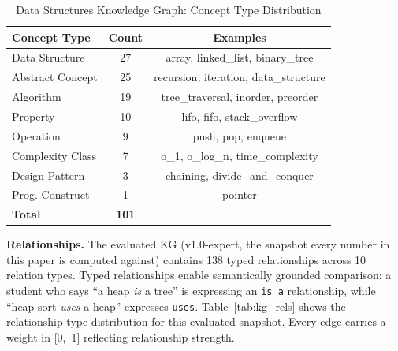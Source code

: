\documentclass[conference]{IEEEtran}
\begin{document}
\begin{table}[t]
\caption{Data Structures Knowledge Graph: Concept Type Distribution}
\label{tab:kg_concepts}
\centering
\begin{tabular}{lcc}
\toprule
\textbf{Concept Type} & \textbf{Count} & \textbf{Examples} \\
\midrule
Data Structure     & 27 & array, linked\_list, binary\_tree \\
Abstract Concept   & 25 & recursion, iteration, data\_structure \\
Algorithm          & 19 & tree\_traversal, inorder, preorder \\
Property           & 10 & lifo, fifo, stack\_overflow \\
Operation          &  9 & push, pop, enqueue \\
Complexity Class   &  7 & o\_1, o\_log\_n, time\_complexity \\
Design Pattern     &  3 & chaining, divide\_and\_conquer \\
Prog. Construct    &  1 & pointer \\
\midrule
\textbf{Total}     & \textbf{101} & \\
\bottomrule
\end{tabular}
\end{table}

\textbf{Relationships.} The evaluated KG (v1.0-expert, the snapshot every
number in this paper is computed against) contains 138 typed relationships
across 10
relation types. Typed relationships enable semantically grounded comparison: a
student who says ``a heap \emph{is} a tree'' is expressing an \texttt{is\_a}
relationship, while ``heap sort \emph{uses} a heap'' expresses \texttt{uses}.
Table~\ref{tab:kg_rels} shows the relationship type distribution for this
evaluated snapshot. Every edge carries
a weight in [0,~1] reflecting relationship strength.
\end{document}
